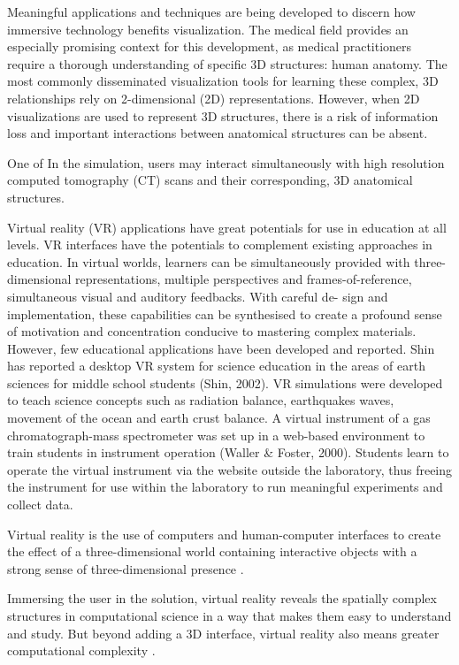  
 Meaningful applications and techniques are being developed to discern how immersive technology benefits visualization. The medical field provides an especially promising context for this development, as medical practitioners require a thorough understanding of specific 3D structures: human anatomy. The most commonly disseminated visualization tools for learning these complex, 3D relationships rely on 2-dimensional (2D) representations. However, when 2D visualizations are used to represent 3D structures, there is a risk of information loss and important interactions between anatomical structures can be absent.
 
 One of In the simulation, users may interact simultaneously with high resolution computed tomography (CT) scans and their corresponding, 3D anatomical structures.

Virtual reality (VR) applications have great potentials for use in education at all levels. VR interfaces have the potentials to complement existing approaches in education. In virtual worlds, learners can be simultaneously provided with three-dimensional representations, multiple perspectives and frames-of-reference, simultaneous visual and auditory feedbacks. With careful de- sign and implementation, these capabilities can be synthesised to create a profound sense of motivation and concentration conducive to mastering complex materials. However, few educational applications have been developed and reported. Shin has reported a desktop VR system for science education in the areas of earth sciences for middle school students (Shin, 2002). VR simulations were developed to teach science concepts such as radiation balance, earthquakes waves, movement of the ocean and earth crust balance. A virtual instrument of a gas chromatograph-mass spectrometer was set up in a web-based environment to train students in instrument operation (Waller \& Foster, 2000). Students learn to operate the virtual instrument via the website outside the laboratory, thus freeing the instrument for use within the laboratory to run meaningful experiments and collect data.

Virtual reality is the use of computers and human-computer interfaces to create the effect of a three-dimensional world containing interactive objects with a strong sense of three-dimensional presence \citep{Bryson1996}.

Immersing the user in the solution, virtual reality reveals the spatially complex structures in computational science in a way that makes them easy to understand and study. But beyond adding a 3D interface, virtual reality also means greater computational complexity \citep{Bryson1996}.


